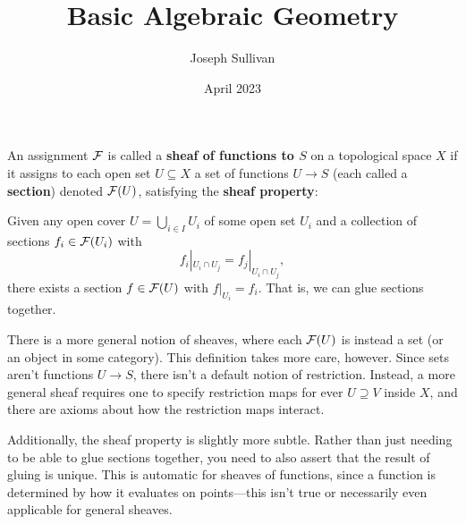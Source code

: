 \documentclass[12pt]{article}
\title{Basic Algebraic Geometry}
\author{Joseph Sullivan}
\date{April 2023}
\begin{document}
\maketitle

\begin{defn}
    An assignment $\mathcal{F}$ is called a \textbf{sheaf of functions to $S$} on a topological space $X$ if it assigns to each open set $U\subseteq X$ a set of functions $U\to S$ (each called a \textbf{section}) denoted $\mathcal{F}(U)$, satisfying the \textbf{sheaf property}:

    Given any open cover $U=\bigcup_{i\in I} U_i$ of some open set $U_i$ and a collection of sections $f_i\in \mathcal{F}(U_i)$ with
    \[f_i|_{U_i\cap U_j} = f_j|_{U_i\cap U_j},\]
    there exists a section $f\in \mathcal{F}(U)$ with $f|_{U_i} = f_i$. That is, we can glue sections together.
\end{defn}

\begin{rmk}
    There is a more general notion of sheaves, where each $\mathcal{F}(U)$ is instead a set (or an object in some category). This definition takes more care, however. Since sets aren't functions $U\to S$, there isn't a default notion of restriction. Instead, a more general sheaf requires one to specify restriction maps for ever $U\supseteq V$ inside $X$, and there are axioms about how the restriction maps interact.

    Additionally, the sheaf property is slightly more subtle. Rather than just needing to be able to glue sections together, you need to also assert that the result of gluing is unique. This is automatic for sheaves of functions, since a function is determined by how it evaluates on points---this isn't true or necessarily even applicable for general sheaves.
\end{rmk}
\end{document}
